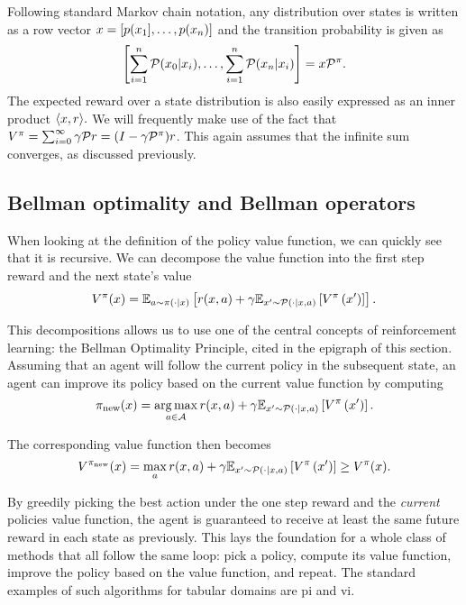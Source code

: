 Following standard Markov chain notation, any distribution over states is written as a row vector $\state = [p(\state_1],\dots, p(\state_n)]$ and the transition probability is given as $$\left[\sum_{i=1}^n \P(\state_0|\state_i), \dots, \sum_{i=1}^n \P(\state_n|\state_i)\right] = \state \P^\pi.$$
The expected reward over a state distribution is also easily expressed as an inner product $\langle \state,r\rangle.$
We will frequently make use of the fact that $V^\pi = \sum_{i=0}^\infty \gamma \P r = (I - \gamma \P^\pi)r$.
This again assumes that the infinite sum converges, as discussed previously.

\subsection{Bellman optimality and Bellman operators}

When looking at the definition of the policy value function, we can quickly see that it is recursive.
We can decompose the value function into the first step reward and the next state's value $$V^\pi(\state) = \mathbb{E}_{a\sim\pi(\cdot|\state)}\left[r(\state,a) + \gamma \mathbb{E}_{\state'\sim\mathcal{P}(\cdot|\state,a)}\left[V^\pi\left(\state'\right)\right]\right].$$

This decompositions allows us to use one of the central concepts of reinforcement learning: the Bellman Optimality Principle, cited in the epigraph of this section.
Assuming that an agent will follow the current policy in the subsequent state, an agent can improve its policy based on the current value function by computing $$\pi_\mathrm{new}(\state) = \argmax_{a \in \actions} r(\state,a) + \gamma \mathbb{E}_{\state'\sim\mathcal{P}(\cdot|\state,a)}\left[V^\pi\left(\state'\right)\right].$$

The corresponding value function then becomes
$$V^{\pi_\mathrm{new}}(\state) = \max_a r(\state,a) + \gamma \mathbb{E}_{\state'\sim\mathcal{P}(\cdot|\state,a)}\left[V^\pi\left(\state'\right)\right] \geq V^\pi(\state).$$

By greedily picking the best action under the one step reward and the \emph{current} policies value function, the agent is guaranteed to receive at least the same future reward in each state as previously.
This lays the foundation for a whole class of methods that all follow the same loop: pick a policy, compute its value function, improve the policy based on the value function, and repeat.
The standard examples of such algorithms for tabular domains are \ac{pi} and \ac{vi}.

